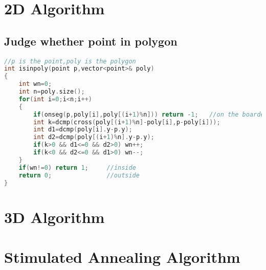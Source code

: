   \section{2D Algorithm}
   \subsection{Judge whether point in polygon}
   \begin{lstlisting}[language=C++]
//p is the point,poly is the polygon
int isinpoly(point p,vector<point>& poly)  
{  
    int wn=0;  
    int n=poly.size();  
    for(int i=0;i<n;i++)  
    {  
        if(onseg(p,poly[i],poly[(i+1)%n])) return -1;   //on the boarder 
        int k=dcmp(cross(poly[(i+1)%n]-poly[i],p-poly[i]));  
        int d1=dcmp(poly[i].y-p.y);  
        int d2=dcmp(poly[(i+1)%n].y-p.y);  
        if(k>0 && d1<=0 && d2>0) wn++;  
        if(k<0 && d2<=0 && d1>0) wn--;  
    }  
    if(wn!=0) return 1;     //inside
    return 0;               //outside
}  
   \end{lstlisting}

  \section{3D Algorithm}

  \section{Stimulated Annealing Algorithm}
